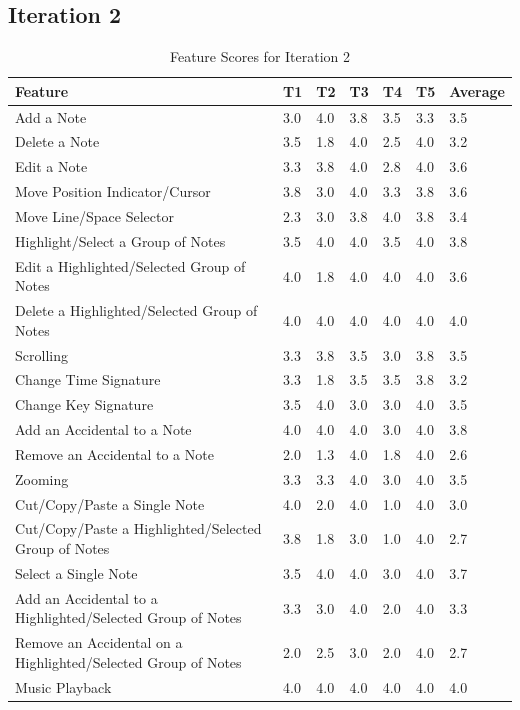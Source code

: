 		\subsection{Iteration 2}
			\begin{longtable}{|p{5cm}|R{.7cm}|R{.7cm}|R{.7cm}|R{.7cm}|R{.7cm}|R{1.5cm}|}
			  \caption{Feature Scores for Iteration 2} \label{tab:results-features-it2} \\ 
			  	\hline
			  	\textbf{Feature} & \textbf{T1} & \textbf{T2} & \textbf{T3} & \textbf{T4} & \textbf{T5} & \textbf{Average} \\ \hline
				Add a Note 																							& 3.0 & 4.0 & 3.8 & 3.5 & 3.3 & 3.5 \\ \hline
				Delete a Note 																						& 3.5 & 1.8 & 4.0 & 2.5 & 4.0 & 3.2 \\ \hline
				Edit a Note 																							& 3.3 & 3.8 & 4.0 & 2.8 & 4.0 & 3.6 \\ \hline
				Move Position Indicator/Cursor 															& 3.8 & 3.0 & 4.0 & 3.3 & 3.8 & 3.6 \\ \hline
				Move Line/Space Selector 																	& 2.3 & 3.0 & 3.8 & 4.0 & 3.8 & 3.4 \\ \hline
				Highlight/Select a Group of Notes 														& 3.5 & 4.0 & 4.0 & 3.5 & 4.0 & 3.8 \\ \hline
				Edit a Highlighted/Selected Group of Notes 										& 4.0 & 1.8 & 4.0 & 4.0 & 4.0 & 3.6 \\ \hline
				Delete a Highlighted/Selected Group of Notes 									& 4.0 & 4.0 & 4.0 & 4.0 & 4.0 & 4.0 \\ \hline
				Scrolling																								& 3.3 & 3.8 & 3.5 & 3.0 & 3.8 & 3.5 \\ \hline
				Change Time Signature 																		& 3.3 & 1.8 & 3.5 & 3.5 & 3.8 & 3.2 \\ \hline
				Change Key Signature 																		& 3.5 & 4.0 & 3.0 & 3.0 & 4.0 & 3.5 \\ \hline
				Add an Accidental to a Note 																& 4.0 & 4.0 & 4.0 & 3.0 & 4.0 & 3.8 \\ \hline
				Remove an Accidental to a Note 														& 2.0 & 1.3 & 4.0 & 1.8 & 4.0 & 2.6 \\ \hline
				Zooming 																								& 3.3 & 3.3 & 4.0 & 3.0 & 4.0 & 3.5 \\ \hline
				Cut/Copy/Paste a Single Note 															& 4.0 & 2.0 & 4.0 & 1.0 & 4.0 & 3.0 \\ \hline
				Cut/Copy/Paste a Highlighted/Selected Group of Notes 					& 3.8 & 1.8 & 3.0 & 1.0 & 4.0 & 2.7 \\ \hline
				Select a Single Note 																			& 3.5 & 4.0 & 4.0 & 3.0 & 4.0 & 3.7 \\ \hline
				Add an Accidental to a Highlighted/Selected Group of Notes 			& 3.3 & 3.0 & 4.0 & 2.0 & 4.0 & 3.3 \\ \hline
				Remove an Accidental on a Highlighted/Selected Group of Notes 	& 2.0 & 2.5 & 3.0 & 2.0 & 4.0 & 2.7 \\ \hline
				Music Playback 																					& 4.0 & 4.0 & 4.0 & 4.0 & 4.0 & 4.0 \\ \hline
			\end{longtable}

